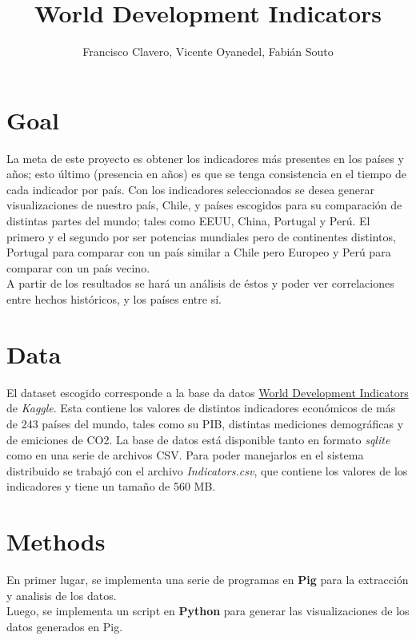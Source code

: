 \documentclass{article}
\begin{document}
\title{World Development Indicators}
\author{Francisco Clavero, Vicente Oyanedel, Fabián Souto}

\maketitle

\section{Goal}
La meta de este proyecto es obtener los indicadores más presentes en los países y años; esto último (presencia en años) es que se tenga consistencia en el tiempo de cada indicador por país. Con los indicadores seleccionados se desea generar visualizaciones de nuestro país, Chile, y países escogidos para su comparación de distintas partes del mundo; tales como EEUU, China, Portugal y Perú. El primero y el segundo por ser potencias mundiales pero de continentes distintos, Portugal para comparar con un país similar a Chile pero Europeo y Perú para comparar con un país vecino.\\

A partir de los resultados se hará un análisis de éstos y poder ver correlaciones entre hechos históricos, y los países entre sí.\\

\section{Data}
El dataset escogido corresponde a la base da datos \href{https://www.kaggle.com/worldbank/world-development-indicators}{World Development Indicators} de \textit{Kaggle}. Esta contiene los valores de distintos indicadores económicos de más de 243 países del mundo, tales como su PIB, distintas mediciones demográficas y de emiciones de CO2. La base de datos está disponible tanto en formato \textit{sqlite} como en una serie de archivos CSV. Para poder manejarlos en el sistema distribuido se trabajó con el archivo \textit{Indicators.csv}, que contiene los valores de los indicadores y tiene un tamaño de 560 MB. \\

\section{Methods}
En primer lugar, se implementa una serie de programas en \textbf{Pig} para la extracción y analisis de los datos. \\
Luego, se implementa un script en \textbf{Python} para generar las visualizaciones de los datos generados en Pig.\\
\end{document}
